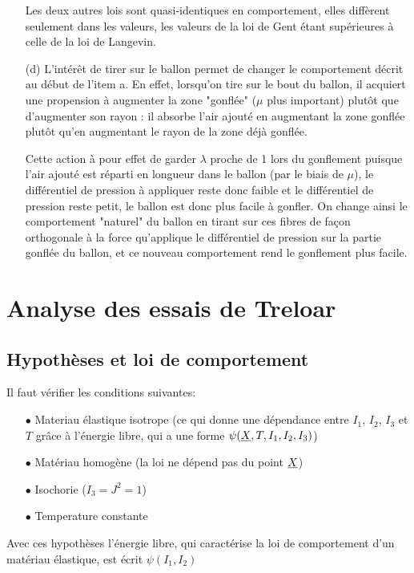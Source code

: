 \documentclass[a4paper,11pt]{article}
\begin{document}
\begin{enumerate}
\hspace{0.8cm}Les deux autres lois sont quasi-identiques en comportement, elles diffèrent seulement dans les valeurs, les valeurs de la loi de Gent étant supérieures à celle de la loi de Langevin.

\item[(d)]
L'intérêt de tirer sur le ballon permet de changer le comportement décrit au début de l'item a. En effet, lorsqu'on tire sur le bout du ballon, il acquiert une propension à augmenter la zone "gonflée" ($\mu$ plus important) plutôt que d'augmenter son rayon : il absorbe l'air ajouté en augmentant la zone gonflée plutôt qu'en augmentant le rayon de la zone déjà gonflée.

\hspace{0.8cm}Cette action à pour effet de garder $\lambda$ proche de 1 lors du gonflement puisque l'air ajouté est réparti en longueur dans le ballon (par le biais de $\mu$), le différentiel de pression à appliquer reste donc faible et le différentiel de pression reste petit, le ballon est donc plus facile à gonfler. On change ainsi le comportement "naturel" du ballon en tirant sur ces fibres de façon orthogonale à la force qu'applique le différentiel de pression sur la partie gonflée du ballon, et ce nouveau comportement rend le gonflement plus facile.
\end{enumerate}

\clearpage


%
%
%
\section{Analyse des essais de Treloar}
\subsection{Hypothèses et loi de comportement}

Il faut vérifier les conditions suivantes:

\begin{itemize}
	\item[$\bullet$] Materiau élastique isotrope (ce qui donne une dépendance entre $I_1$, $I_2$, $I_3$ et $T$ grâce à l'énergie libre, qui a une forme $\displaystyle\psi(\uline{X},T,I_1,I_2,I_3)$)
	\item[$\bullet$] Matériau homogène (la loi ne dépend pas du point $\uline{X}$)
	\item[$\bullet$] Isochorie ($I_3 =J^2=1$)
	\item[$\bullet$] Temperature constante
\end{itemize}
Avec ces hypothèses l'énergie libre, qui caractérise la loi de comportement d'un matériau élastique, est écrit $\psi(I_1,I_2)$
\end{document}
